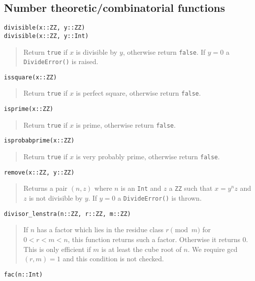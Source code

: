 \documentclass[a4paper,10pt]{article}
\newcommand{\code}{\lstinline}
\newcommand{\desc}[1]{\vspace{-3mm}\begin{quote}#1\end{quote}}
\begin{document}
{{{\subsection{Number theoretic/combinatorial functions}

\begin{lstlisting}
divisible(x::ZZ, y::ZZ)
divisible(x::ZZ, y::Int)
\end{lstlisting}

\desc{Return \code{true} if $x$ is divisible by $y$, otherwise return \code{false}. If
$y = 0$ a \code{DivideError()} is raised.}

\begin{lstlisting}
issquare(x::ZZ)
\end{lstlisting}

\desc{Return \code{true} if $x$ is perfect square, otherwise return \code{false}.}

\begin{lstlisting}
isprime(x::ZZ)
\end{lstlisting}

\desc{Return \code{true} if $x$ is prime, otherwise return \code{false}.}

\begin{lstlisting}
isprobabprime(x::ZZ)
\end{lstlisting}

\desc{Return \code{true} if $x$ is very probably prime, otherwise return \code{false}.}

\begin{lstlisting}
remove(x::ZZ, y::ZZ)
\end{lstlisting}

\desc{Returns a pair $(n, z)$ where $n$ is an \code{Int} and $z$ a \code{ZZ} such that
$x = y^nz$ and $z$ is not divisible by $y$. If $y = 0$ a \code{DivideError()} is thrown.}

\begin{lstlisting}
divisor_lenstra(n::ZZ, r::ZZ, m::ZZ)
\end{lstlisting}

\desc{If $n$ has a factor which lies in the residue class $r \pmod{m}$ for $0 < r < m < n$,
this function returns such a factor. Otherwise it returns $0$. This is only efficient if 
$m$ is at least the cube root of $n$. We require gcd$(r, m) = 1$ and this condition is not
checked.}

\begin{lstlisting}
fac(n::Int)
\end{lstlisting}

}}}
\end{document}
